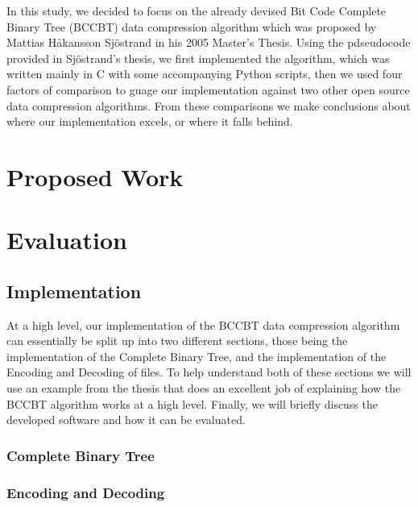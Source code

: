 \documentclass[12pt]{IEEEtran}
\begin{document}
In this study, we decided to focus on the already devised Bit Code Complete Binary Tree (BCCBT) data compression algorithm
which was
proposed by Mattias Håkansson Sjöstrand in his 2005 Master's Thesis\cite{Sjostrand}.
Using the pdseudocode provided in
Sjöstrand's thesis, we first implemented the algorithm, which was written mainly in C with some accompanying Python scripts, then we used four factors of comparison
to guage our implementation against two other open source data compression algorithms. From these comparisons we make conclusions about where our
implementation excels, or where it falls behind.

\section{Proposed Work}


\section{Evaluation}

\subsection{Implementation}
At a high level, our implementation of the BCCBT data compression algorithm can essentially be split up into two different sections,
those being the implementation of the Complete Binary Tree, and the implementation of the Encoding and Decoding of files.
To help understand both of these sections we will use an example from the thesis that does an excellent job of explaining
how the BCCBT algorithm works at a high level.
Finally, we will briefly discuss the developed software and how it can be evaluated.
\subsubsection{Complete Binary Tree} 
\subsubsection{Encoding and Decoding}
\end{document}
